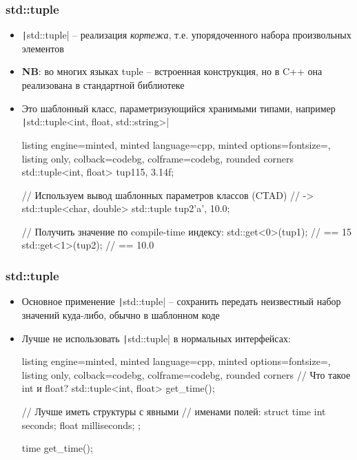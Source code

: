 \documentclass[10pt]{beamer}
\begin{document}
\begin{frame}[fragile]
\frametitle{std::tuple}
\begin{itemize}
\item \texttt|std::tuple| -- реализация \textit{кортежа}, т.е. упорядоченного набора произвольных элементов
\pause
\item \textbf{NB}: во многих языках tuple -- встроенная конструкция, но в C++ она реализована в стандартной библиотеке
\pause
\item Это шаблонный класс, параметризующийся хранимыми типами, например \texttt|std::tuple<int, float, std::string>|
\pause
{}
\begin{tcblisting}{listing engine=minted, minted language=cpp, minted options={fontsize=\scriptsize}, listing only, colback=codebg, colframe=codebg, rounded corners}
std::tuple<int, float> tup1{15, 3.14f};

// Используем вывод шаблонных параметров классов (CTAD)
// -> std::tuple<char, double>
std::tuple tup2{'a', 10.0};

// Получить значение по compile-time индексу:
std::get<0>(tup1); // == 15
std::get<1>(tup2); // == 10.0
\end{tcblisting}
\end{itemize}
\end{frame}

\begin{frame}[fragile]
\frametitle{std::tuple}
\begin{itemize}
\item Основное применение \texttt|std::tuple| -- сохранить передать неизвестный набор значений куда-либо, обычно в шаблонном коде
\pause
\item Лучше не использовать \texttt|std::tuple| в нормальных интерфейсах:
\begin{tcblisting}{listing engine=minted, minted language=cpp, minted options={fontsize=\scriptsize}, listing only, colback=codebg, colframe=codebg, rounded corners}
// Что такое int и float?
std::tuple<int, float> get_time();

// Лучше иметь структуры с явными
// именами полей:
struct time {
  int seconds;
  float milliseconds;
};

time get_time();
\end{tcblisting}
\end{itemize}
\end{frame}
\end{document}
